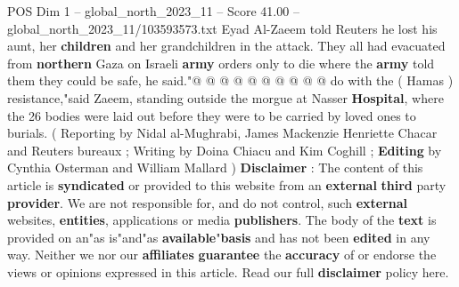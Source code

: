 \begin{textsample}{POS Dim 1 – global\_north\_2023\_11 – Score 41.00 – global\_north\_2023\_11/103593573.txt}
Eyad Al-Zaeem told Reuters he lost his aunt, her \textbf{children} and her grandchildren in the attack.
They all had evacuated from \textbf{northern} Gaza on Israeli \textbf{army} orders only to die where the \textbf{army} told them they could be safe, he said."@ @ @ @ @ @ @ @ @ @ do with the ( Hamas ) resistance,"said Zaeem, standing outside the morgue at Nasser \textbf{Hospital}, where the 26 bodies were laid out before they were to be carried by loved ones to burials. ( Reporting by Nidal al-Mughrabi, James Mackenzie Henriette Chacar and Reuters bureaux ; Writing by Doina Chiacu and Kim Coghill ; \textbf{Editing} by Cynthia Osterman and William Mallard ) \textbf{Disclaimer} : The content of this article is \textbf{syndicated} or provided to this website from an \textbf{external} \textbf{third} party \textbf{provider}.
We are not responsible for, and do not control, such \textbf{external} websites, \textbf{entities}, applications or media \textbf{publishers}.
The body of the \textbf{text} is provided on an"as is"and"as \textbf{available}"\textbf{basis} and has not been \textbf{edited} in any way.
Neither we nor our \textbf{affiliates} \textbf{guarantee} the \textbf{accuracy} of or endorse the views or opinions expressed in this article.
Read our full \textbf{disclaimer} policy here.

\end{textsample}

